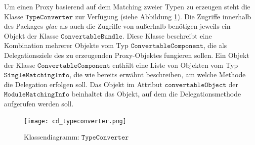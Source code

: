 Um einen Proxy basierend auf dem Matching zweier Typen zu erzeugen steht die Klasse $\texttt{TypeConverter}$ zur Verfügung (siehe Abbildung \ref{cd_typeconverter}). Die Zugriffe innerhalb des Packages \emph{glue} als auch die Zugriffe von außerhalb benötigen jeweils ein Objekt der Klasse $\texttt{ConvertableBundle}$. Diese Klasse beschreibt eine Kombination mehrerer Objekte vom Typ $\texttt{ConvertableComponent}$, die als Delegationsziele des zu erzeugenden Proxy-Objektes fungieren sollen. Ein Objekt der Klasse $\texttt{ConvertableComponent}$ enthält eine Liste von Objekten vom Typ $\texttt{SingleMatchingInfo}$, die wie bereits erwähnt beschreiben, am welche Methode die Delegation erfolgen soll. Das Objekt im Attribut $\texttt{convertableObject}$ der $\texttt{ModuleMatchingInfo}$ beinhaltet das Objekt, auf dem die Delegationsmethode aufgerufen werden soll.
\begin{figure}[h!]
\texttt{[image: cd\_typeconverter.png]}
\caption{Klassendiagramm: $\texttt{TypeConverter}$}
\label{cd_typeconverter}
\end{figure}

